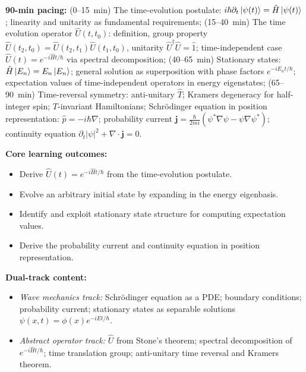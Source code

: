 \documentclass[11pt,a4paper]{article}
\begin{document}
\medskip
\begin{tcolorbox}[modulebox, title={Module~I.3 --- Lecture L05: Time Evolution I --- Time-Independent Hamiltonians}]
\textbf{90-min pacing:} (0--15~min) The time-evolution postulate:
$i\hbar\partial_t\ket{\psi(t)}=\hat{H}\ket{\psi(t)}$; linearity and
unitarity as fundamental requirements;
(15--40~min) The time evolution operator $\hat{U}(t,t_0)$: definition,
group property $\hat{U}(t_2,t_0)=\hat{U}(t_2,t_1)\hat{U}(t_1,t_0)$,
unitarity $\hat{U}^\dagger\hat{U}=\hat{1}$;
time-independent case $\hat{U}(t)=e^{-i\hat{H}t/\hbar}$ via spectral decomposition;
(40--65~min) Stationary states: $\hat{H}\ket{E_n}=E_n\ket{E_n}$;
general solution as superposition with phase factors $e^{-iE_n t/\hbar}$;
expectation values of time-independent operators in energy eigenstates;
(65--90~min) Time-reversal symmetry: anti-unitary $\hat{T}$;
Kramers degeneracy for half-integer spin;
$T$-invariant Hamiltonians; Schr\"odinger equation in position representation:
$\hat{p}=-i\hbar\nabla$; probability current $\mathbf{j}=\tfrac{\hbar}{2mi}(\psi^*\nabla\psi-\psi\nabla\psi^*)$;
continuity equation $\partial_t|\psi|^2+\nabla\cdot\mathbf{j}=0$.

\medskip\textbf{Core learning outcomes:}
\begin{itemize}[leftmargin=1.4em,topsep=2pt,itemsep=1pt]
  \item Derive $\hat{U}(t)=e^{-i\hat{H}t/\hbar}$ from the time-evolution postulate.
  \item Evolve an arbitrary initial state by expanding in the energy eigenbasis.
  \item Identify and exploit stationary state structure for computing expectation values.
  \item Derive the probability current and continuity equation in position representation.
\end{itemize}

\medskip\textbf{Dual-track content:}
\begin{itemize}[leftmargin=1.4em,topsep=2pt,itemsep=1pt]
  \item \textit{Wave mechanics track:} Schr\"odinger equation as a PDE; boundary conditions;
    probability current; stationary states as separable solutions $\psi(x,t)=\phi(x)e^{-iEt/\hbar}$.
  \item \textit{Abstract operator track:} $\hat{U}$ from Stone's theorem; spectral decomposition
    of $e^{-i\hat{H}t/\hbar}$; time translation group; anti-unitary time reversal
    and Kramers theorem.
\end{itemize}


\end{tcolorbox}
\end{document}
